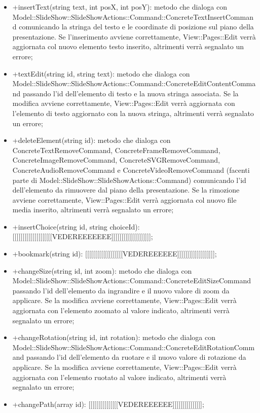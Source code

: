 {{\begin{itemize}
						\item +insertText(string text, int posX, int posY): metodo che dialoga con Model::SlideShow::SlideShowActions::Command::ConcreteTextInsertCommand comunicando la stringa del testo e le coordinate di posizione sul piano della presentazione. Se l'inserimento avviene correttamente, View::Pages::Edit verrà aggiornata col nuovo elemento testo inserito, altrimenti verrà segnalato un errore;
						\item +textEdit(string id, string text): metodo che dialoga con Model::SlideShow::SlideShowActions::Command::ConcreteEditContentCommand passando l'id dell'elemento di testo e la nuova stringa associata. Se la modifica avviene correttamente, View::Pages::Edit verrà aggiornata con l'elemento di testo aggiornato con la nuova stringa, altrimenti verrà segnalato un errore;
						\item +deleteElement(string id): metodo che dialoga con ConcreteTextRemoveCommand, ConcreteFrameRemoveCommand, ConcreteImageRemoveCommand, ConcreteSVGRemoveCommand, ConcreteAudioRemoveCommand e ConcreteVideoRemoveCommand (facenti parte di Model::SlideShow::SlideShowActions::Command) comunicando l'id dell'elemento da rimuovere dal piano della presentazione. Se la rimozione avviene correttamente, View::Pages::Edit verrà aggiornata col nuovo file media inserito, altrimenti verrà segnalato un errore;
						\item +insertChoice(string id, string choiceId): [[[[[[[[[[[[[[[[[[[[VEDEREEEEEEE]]]]]]]]]]]]]]]]]]]];
						\item +bookmark(string id): [[[[[[[[[[[[[[[[[[[VEDEREEEEEE]]]]]]]]]]]]]]]]]]];
						\item +changeSize(string id, int zoom): metodo che dialoga con Model::SlideShow::SlideShowActions::Command::ConcreteEditSizeCommand passando l'id dell'elemento da ingrandire e il nuovo valore di zoom da applicare. Se la modifica avviene correttamente, View::Pages::Edit verrà aggiornata con l'elemento zoomato al valore indicato, altrimenti verrà segnalato un errore;
						\item +changeRotation(string id, int rotation): metodo che dialoga con Model::SlideShow::SlideShowActions::Command::ConcreteEditRotationCommand passando l'id dell'elemento da ruotare e il nuovo valore di rotazione da applicare. Se la modifica avviene correttamente, View::Pages::Edit verrà aggiornata con l'elemento ruotato al valore indicato, altrimenti verrà segnalato un errore;
						\item +changePath(array id): [[[[[[[[[[[[[[[VEDEREEEEEE]]]]]]]]]]]]]]];

\end{itemize}}}
